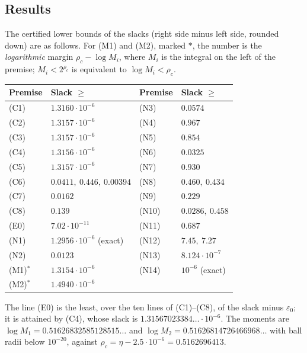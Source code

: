 \documentclass[11pt]{article}
\theoremstyle{definition}
\newcommand{\eps}{\varepsilon}
\begin{document}
\subsection{Results}
The certified lower bounds of the slacks (right side minus left side, rounded down) are as follows. For
\textup{(M1)} and \textup{(M2)}, marked $\ast$, the number is the \emph{logarithmic} margin $\rho_c-\log M_i$, where
$M_i$ is the integral on the left of the premise; $M_i<2^{\rho_c}$ is equivalent to $\log M_i<\rho_c$.
\begin{center}
\begin{tabular}{llll}
\toprule
Premise & Slack $\ge$ & Premise & Slack $\ge$\\
\midrule
(C1) & $1.3160\cdot10^{-6}$ & (N3) & $0.0574$\\
(C2) & $1.3157\cdot10^{-6}$ & (N4) & $0.967$\\
(C3) & $1.3157\cdot10^{-6}$ & (N5) & $0.854$\\
(C4) & $1.3156\cdot10^{-6}$ & (N6) & $0.0325$\\
(C5) & $1.3157\cdot10^{-6}$ & (N7) & $0.930$\\
(C6) & $0.0411,\ 0.446,\ 0.00394$ & (N8) & $0.460,\ 0.434$\\
(C7) & $0.0162$ & (N9) & $0.229$\\
(C8) & $0.139$ & (N10) & $0.0286,\ 0.458$\\
(E0) & $7.02\cdot10^{-11}$ & (N11) & $0.687$\\
(N1) & $1.2956\cdot10^{-6}$ (exact) & (N12) & $7.45,\ 7.27$\\
(N2) & $0.0123$ & (N13) & $8.124\cdot10^{-7}$\\
(M1)$^\ast$ & $1.3154\cdot10^{-6}$ & (N14) & $10^{-6}$ (exact)\\
(M2)$^\ast$ & $1.4940\cdot10^{-6}$ & &\\
\bottomrule
\end{tabular}
\end{center}
The line \textup{(E0)} is the least, over the ten lines of \textup{(C1)--(C8)}, of the slack minus $\eps_0$; it is
attained by \textup{(C4)}, whose slack is $1.31567023384\ldots\cdot10^{-6}$.
The moments are $\log M_1=0.51626832585128515\ldots$ and $\log M_2=0.51626814726466968\ldots$ with ball radii below
$10^{-20}$, against $\rho_c=\eta-2.5\cdot10^{-6}=0.5162696413$.
\end{document}
